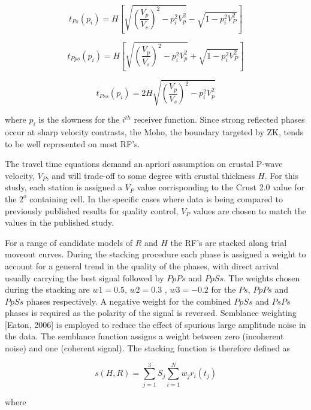 \documentclass[draft, 12pt]{article}
\begin{document}
\begin{equation}
t_{Ps}(p_i)=H \left[ \sqrt{ \left(\frac{V_p}{V_s}\right)^2 - p_i^2V_p^2} - \sqrt{1 - p_i^2V_P^2} \right]
\end{equation}

\begin{equation}
t_{Pps}(p_i)=H \left[ \sqrt{ \left(\frac{V_p}{V_s}\right)^2 - p_i^2V_p^2} + \sqrt{1 - p_i^2V_P^2} \right]
\end{equation}

\begin{equation}
t_{Pss}(p_i)= 2H  \sqrt{ \left(\frac{V_p}{V_s}\right)^2 - p_i^2V_p^2}
\end{equation}

where $p_i$ is the slowness for the $i^{th}$ receiver function. Since strong reflected phases occur at sharp velocity contrasts, the Moho, the boundary targeted by ZK, tends to be well represented on most RF's.

  The travel time equations demand an apriori assumption on crustal P-wave velocity, $V_P$, and will trade-off to some degree with crustal thickness $H$. For this study, each station is assigned a $V_P$ value corrisponding to the Crust 2.0 value for the $2^o$ containing cell. In the specific cases where data is being compared to previously published results for quality control, $V_P$  values are chosen to match the values in the published study.

  For a range of candidate models of $R$ and $H$ the RF's are stacked along trial moveout curves. During the stacking procedure each phase is assigned a weight to account for a general trend in the quality of the phases, with direct arrival usually carrying the best signal followed by $PpPs$ and $PpSs$. The weights chosen during the stacking are $w1 = 0.5$, $w2 = 0.3$ , $w3 = -0.2$ for the $Ps$, $PpPs$ and $PpSs$ phases respectively. A negative weight for the combined $PpSs$ and $PsPs$ phases is required as the polarity of the signal is reversed. Semblance weighting [Eaton, 2006] is employed to reduce the effect of spurious large amplitude noise in the data. The semblance function assigns a weight between zero (incoherent noise) and one (coherent signal). The stacking function is therefore defined as

\begin{equation}
s(H,R) = \sum_{j=1}^{3} S_j \sum_{i=1}^N w_jr_i(t_j)
\end{equation}

where
\end{document}
